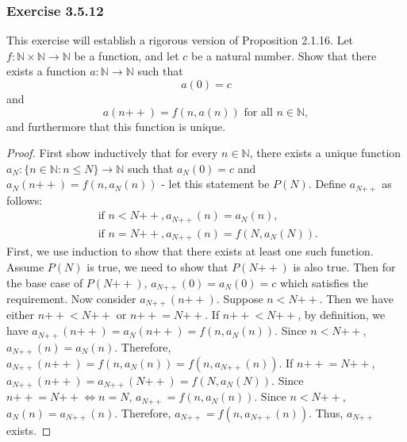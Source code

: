 \documentclass[12pt, letter]{article}
\begin{document}
\subsubsection*{Exercise 3.5.12}
This exercise will establish a rigorous version of Proposition 2.1.16. Let $f:\mathbb{N}\times \mathbb{N}\to \mathbb{N}$ be a function, and let $c$ be a natural number. Show that there exists a function $a:\mathbb{N}\to \mathbb{N}$ such that 
\begin{equation*}
    a(0)=c
\end{equation*}
and 
\begin{equation*}
    a(n\mathtt{++})=f(n,a(n))\text{ for all }n\in \mathbb{N},
\end{equation*}
and furthermore that this function is unique.
\begin{proof}
    First show inductively that for every $n\in\mathbb{N}$, there exists a unique function $a_N:\{n\in\mathbb{N}:n\leq N\}\to \mathbb{N}$ such that $a_N(0)=c$ and $a_N(n\mathtt{++})=f(n,a_N(n))$ - let this statement be $P(N)$. Define $a_{N\mathtt{++}}$ as follows: 
    \begin{equation*}
        \begin{gathered}
            \text{ if }n < N\mathtt{++}, a_{N\mathtt{++}}(n)=a_N(n),\\
            \text{ if }n = N\mathtt{++}, a_{N\mathtt{++}}(n)=f(N,a_N(N)).
        \end{gathered}
    \end{equation*}
    First, we use induction to show that there exists at least one such function. Assume $P(N)$ is true, we need to show that $P(N\mathtt{++})$ is also true.
    Then for the base case of $P(N\mathtt{++})$, $a_{N\mathtt{++}}(0)=a_N(0)=c$ which satisfies the requirement. Now consider $a_{N\mathtt{++}}(n\mathtt{++})$. Suppose $n<N\mathtt{++}$. Then we have either $n\mathtt{++}<N\mathtt{++}$ or $n\mathtt{++}=N\mathtt{++}$. If $n\mathtt{++}<N\mathtt{++}$, by definition, we have $a_{N\mathtt{++}}(n\mathtt{++})=a_N(n\mathtt{++})=f(n,a_N(n))$. Since $n<N\mathtt{++}$,
    $a_{N\mathtt{++}}(n)=a_N(n)$. Therefore, $a_{N\mathtt{++}}(n\mathtt{++})=f(n,a_N(n))=f(n,a_{N\mathtt{++}}(n))$. If $n\mathtt{++}=N\mathtt{++}$, $a_{N\mathtt{++}}(n\mathtt{++})=a_{N\mathtt{++}}(N\mathtt{++})=f(N,a_N(N))$. Since $n\mathtt{++}=N\mathtt{++}\iff n=N$, $a_{N\mathtt{++}}=f(n,a_N(n))$. Since $n<N\mathtt{++}$, $a_N(n)=a_{N\mathtt{++}}(n)$. Therefore, $a_{N\mathtt{++}}=f(n,a_{N\mathtt{++}}(n))$. 
    Thus, $a_{N\mathtt{++}}$ exists. 
    

\end{proof}
\end{document}
